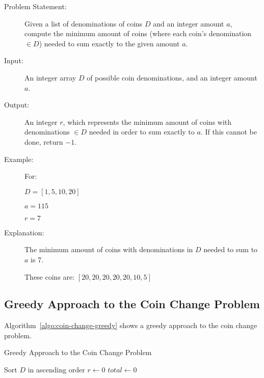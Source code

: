 \begin{description}
    \item[Problem Statement:]
        Given a list of denominations of coins $D$ and an integer amount $a$, compute the minimum amount of coins (where each coin's denomination $\in D$) needed to sum exactly to the given amount $a$.
        
    \item[Input:] 
        An integer array $D$ of possible coin denominations, and an integer amount $a$.
        
    \item[Output:] 
        An integer $r$, which represents the minimum amount of coins with denominations $\in D$ needed in order to sum exactly to $a$. If this cannot be done, return $-1$.
        
    \item[Example:]
        For: 

        $D = [1, 5, 10, 20]$

        $a = 115$

        $r = 7$

    \item[Explanation:]
        The minimum amount of coins with denominations in $D$ needed to sum to $a$ is 7.

        These coins are: $[20,20,20,20,20,10,5]$


\end{description}

\subsection{Greedy Approach to the Coin Change Problem}

Algorithm~\ref{algo:coin-change-greedy} shows a greedy approach to the coin change problem.

\begin{algorithm}[H]
    \caption{Greedy Approach to the Coin Change Problem}
    \label{algo:coin-change-greedy}
    Sort $D$ in ascending order\;
    $r \leftarrow 0$\;
    $total \leftarrow 0$\;
\end{algorithm}

